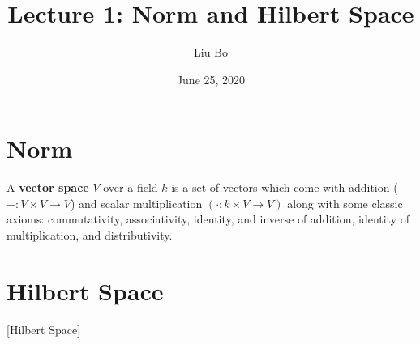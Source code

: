 \documentclass[11pt]{article}
\title{Lecture 1: Norm and Hilbert Space}
\author{Liu Bo}
\date{June 25, 2020}
\begin{document}
\maketitle

\section{Norm}
\begin{definition}
A \textbf{vector space} $V$ over a field $k$ is a set of vectors which come with addition ($+: V\times V \to V$) and scalar multiplication $(\cdot: k\times V\to V)$ along with some classic axioms: commutativity, associativity, identity, and inverse of addition, identity of multiplication, and distributivity.
\end{definition}

\begin{definition}[Norm]

\end{definition}


\section{Hilbert Space}[Hilbert Space]
\end{document}
